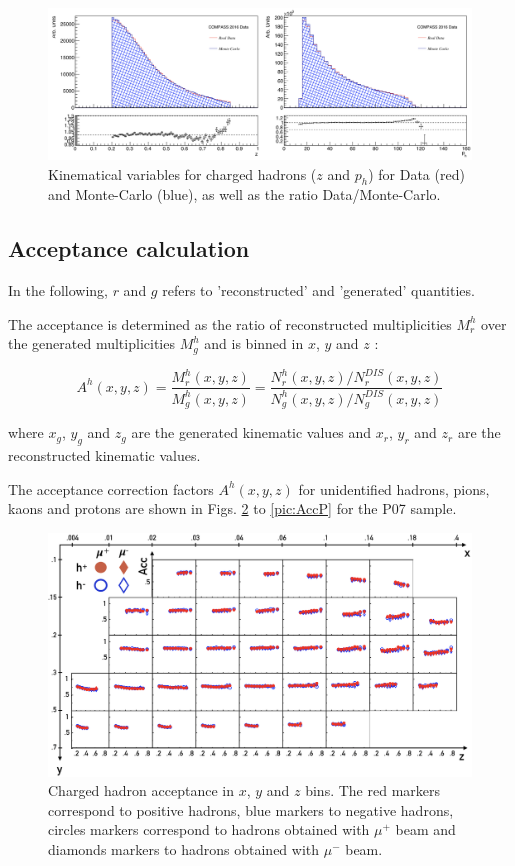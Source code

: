 \begin{figure}[!h]
	\includegraphics[scale=0.5]{./gfx/SIDIS_kin.png}
	\caption{Kinematical variables for charged hadrons ($z$ and $p_h$) for Data (red) and Monte-Carlo (blue), as well as the ratio Data/Monte-Carlo.}
	\label{pic:MCSIDISkin}
\end{figure}

\subsection{Acceptance calculation}

In the following, $r$ and $g$ refers to 'reconstructed' and 'generated' quantities.

The acceptance is determined as the ratio of reconstructed multiplicities $M^h_r$ over the generated multiplicities $M^h_g$ and is binned in $x$, $y$ and $z$ :

\begin{equation}
  A^h(x,y,z) = \frac{M^h_r(x,y,z)}{M^h_g(x,y,z)}=\frac{N^h_r(x,y,z)/N^{DIS}_r(x,y,z)}{N^h_g(x,y,z)/N^{DIS}_g(x,y,z)}
\end{equation}

where $x_g$, $y_g$ and $z_g$ are the generated kinematic values and $x_r$, $y_r$ and $z_r$ are the reconstructed kinematic values.

The acceptance correction factors $A^h(x,y,z)$ for unidentified hadrons, pions, kaons and protons are shown in Figs. \ref{pic:AccH} to \ref{pic:AccP} for the P07 sample.

\begin{figure}
	\includegraphics[scale=0.6]{./gfx/AccH.png}
	\caption{Charged hadron acceptance in $x$, $y$ and $z$ bins. The red markers correspond to positive hadrons, blue markers to negative hadrons, circles markers correspond to hadrons obtained with $\mu^+$ beam and diamonds markers to hadrons obtained with $\mu^-$ beam.}
	\label{pic:AccH}
\end{figure}

